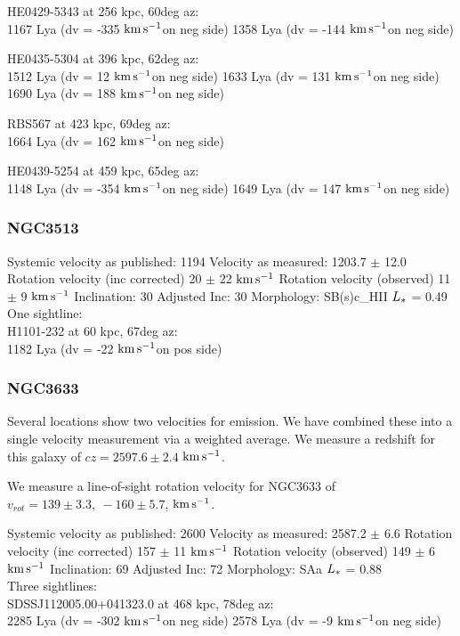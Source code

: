 \documentclass[iop]{emulateapj-rtx4}
\newcommand{\kms}{$\rm km\, s^{-1}$}
\begin{document}
HE0429-5343 at 256 kpc, 60deg az: \\
1167 Lya (dv = -335 \kms on neg side)
1358 Lya (dv = -144 \kms on neg side)

HE0435-5304 at 396 kpc, 62deg az: \\
1512 Lya (dv = 12 \kms on neg side)
1633 Lya (dv = 131 \kms on neg side)
1690 Lya (dv = 188 \kms on neg side)

RBS567 at 423 kpc, 69deg az: \\
1664 Lya (dv = 162 \kms on neg side)

HE0439-5254 at 459 kpc, 65deg az: \\
1148 Lya (dv = -354 \kms on neg side)
1649 Lya (dv = 147 \kms on neg side)



\subsubsection{NGC3513}
Systemic velocity as published: 1194
Velocity as measured: 1203.7 $\pm$ 12.0
Rotation velocity (inc corrected) 20 $\pm$ 22 \kms
Rotation velocity (observed) 11 $\pm$ 9 \kms
Inclination: 30
Adjusted Inc: 30
Morphology: SB(s)c\_HII
$L_{\**}$ = 0.49 \\

One sightline: \\
H1101-232 at 60 kpc, 67deg az: \\
1182 Lya (dv = -22 \kms on pos side)


\subsubsection{NGC3633}
Several locations show two velocities for emission. We have combined these into a single velocity measurement via a weighted average. We measure a redshift for this galaxy of $cz = 2597.6 \pm 2.4$ \kms.

We measure a line-of-sight rotation velocity for NGC3633 of $v_{rot}=139\pm 3.3,~-160\pm5.7$,  \kms.


Systemic velocity as published: 2600
Velocity as measured: 2587.2 $\pm$ 6.6
Rotation velocity (inc corrected) 157 $\pm$ 11 \kms
Rotation velocity (observed) 149 $\pm$ 6 \kms
Inclination: 69
Adjusted Inc: 72
Morphology: SAa
$L_{\**}$ = 0.88 \\

Three sightlines: \\
SDSSJ112005.00+041323.0 at 468 kpc, 78deg az: \\
2285 Lya (dv = -302 \kms on neg side)
2578 Lya (dv = -9 \kms on neg side)
\end{document}
